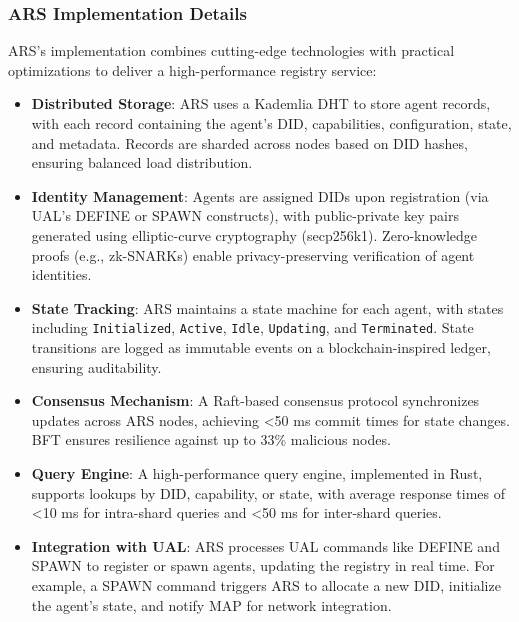 \documentclass[a4paper,11pt]{article}
\begin{document}
\subsubsection{ARS Implementation Details}
ARS’s implementation combines cutting-edge technologies with practical optimizations to deliver a high-performance registry service:
\begin{itemize}[leftmargin=*]
    \item \textbf{Distributed Storage}: ARS uses a Kademlia DHT to store agent records, with each record containing the agent’s DID, capabilities, configuration, state, and metadata. Records are sharded across nodes based on DID hashes, ensuring balanced load distribution.
    \item \textbf{Identity Management}: Agents are assigned DIDs upon registration (via UAL’s DEFINE or SPAWN constructs), with public-private key pairs generated using elliptic-curve cryptography (secp256k1). Zero-knowledge proofs (e.g., zk-SNARKs) enable privacy-preserving verification of agent identities.
    \item \textbf{State Tracking}: ARS maintains a state machine for each agent, with states including \texttt{Initialized}, \texttt{Active}, \texttt{Idle}, \texttt{Updating}, and \texttt{Terminated}. State transitions are logged as immutable events on a blockchain-inspired ledger, ensuring auditability.
    \item \textbf{Consensus Mechanism}: A Raft-based consensus protocol synchronizes updates across ARS nodes, achieving <50 ms commit times for state changes. BFT ensures resilience against up to 33\% malicious nodes.
    \item \textbf{Query Engine}: A high-performance query engine, implemented in Rust, supports lookups by DID, capability, or state, with average response times of <10 ms for intra-shard queries and <50 ms for inter-shard queries.
    \item \textbf{Integration with UAL}: ARS processes UAL commands like DEFINE and SPAWN to register or spawn agents, updating the registry in real time. For example, a SPAWN command triggers ARS to allocate a new DID, initialize the agent’s state, and notify MAP for network integration.
\end{itemize}
\end{document}
